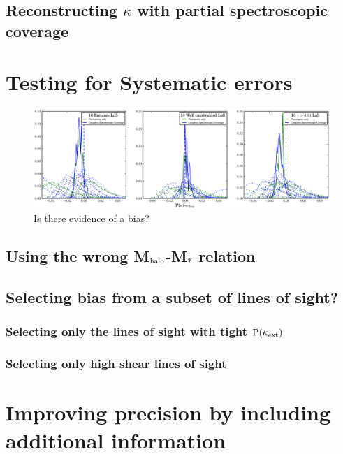 \documentclass[useAMS,usenatbib]{mn2e}
\begin{document}
\subsection{Reconstructing $\kappa$ with partial spectroscopic coverage}








\section{Testing for Systematic errors}
\begin{figure}
\includegraphics[width=\textwidth]{figs/biascheck.eps}
\caption[magcut]{Is there evidence of a bias?}
\label{fig:where}
\end{figure}

\subsection{Using the wrong M$_{\rm halo}$-M$_{*}$ relation}
\subsection{Selecting bias from a subset of lines of sight?}
\subsubsection{Selecting only the lines of sight with tight ${\rm P}(\kappa_{\rm ext})$}
\subsubsection{Selecting only high shear lines of sight}


\section{Improving precision by including additional information}
\end{document}
